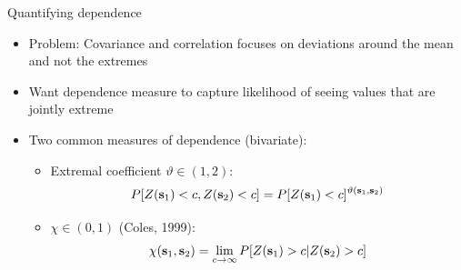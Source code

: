 \documentclass{beamer}
\begin{document}


\begin{frame}{Quantifying dependence}
	\begin{itemize}\setlength{\itemsep}{1em}
		\item \alert{Problem}: Covariance and correlation focuses on deviations around the mean and not the extremes
		\item Want dependence measure to capture likelihood of seeing values that are jointly extreme
		\item Two common measures of dependence (bivariate):
		\begin{itemize}\setlength{\itemsep}{0.5em}
			\item Extremal coefficient $\vartheta \in (1, 2)$: $$P[Z(\mathbf{s}_1)<c, Z(\mathbf{s}_2)<c] = P[Z(\mathbf{s}_1)<c]^{\vartheta(\mathbf{s}_1,\mathbf{s}_2)}$$
			\item $\chi \in (0, 1)$ (Coles, 1999): $$\chi(\mathbf{s}_1,\mathbf{s}_2) = \lim_{c\rightarrow \infty}P[Z(\mathbf{s}_1)>c|Z(\mathbf{s}_2)>c]$$
		\end{itemize}
	\end{itemize}
\end{frame}
\end{document}
